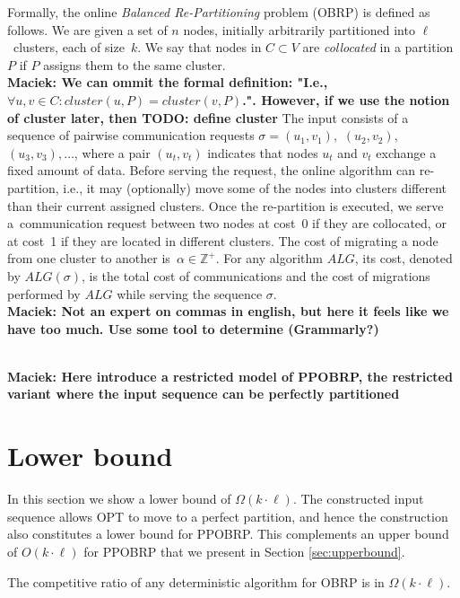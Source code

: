 \documentclass[manuscript,screen=true]{acmart}
\newcommand{\OBRP}{OBRP}
\newcommand{\PPOBRP}{PPOBRP}
\newcommand\maciek[1]{\color{brown}\textbf{\\ Maciek: #1}\color{black}}
\begin{document}
Formally, the online \emph{Balanced Re-Partitioning} problem (\OBRP{}) is defined as
follows. We are given a set of $n$ nodes,
initially arbitrarily partitioned into $\ell$~clusters,
each of size~$k$.
We say that nodes in $C \subset V$ are \emph{collocated} in a partition $P$
if $P$ assigns them to the same cluster.
\maciek{We can ommit the formal definition: "I.e.,
$\forall u,v \in C: \mathit{cluster} (u,P) = \mathit{cluster} (v,P)$.". However, if we use the notion of cluster later, then TODO: define cluster}
The input consists of a sequence of pairwise communication requests
$\sigma = (u_1,v_1),$ $(u_2,v_2),$ $(u_3,v_3), \ldots$,
where a pair $(u_t,v_t)$ indicates that nodes $u_t$ and $v_t$ exchange a fixed amount of data.
Before serving the request,
the online algorithm
can re-partition,
i.e.,
it may (optionally) move some of the nodes into clusters different than their current assigned clusters.
Once the re-partition is executed,
we serve
a~communication request between two  nodes at cost~0 if they are collocated,
or at cost~1 if they are located in different clusters.
The cost of migrating a node from one cluster to another
is~$\alpha \in \mathbb{Z}^+$.
For any algorithm $ALG$,
its cost,
denoted by $ALG(\sigma)$,
is the total cost of communications and
the cost of migrations performed by $ALG$ while serving the sequence $\sigma$.
\maciek{Not an expert on commas in english, but here it feels like we have too much. Use some tool to determine (Grammarly?)}

\maciek{Here introduce a restricted model of \PPOBRP{}, the restricted variant where the input sequence can be perfectly partitioned}

\section{Lower bound} %

In this section we show a lower bound of $\Omega(k \cdot \ell)$.
The constructed input sequence allows OPT to move to a perfect partition, and hence
the construction also constitutes a lower bound for \PPOBRP{}.
This complements an upper bound of $O(k \cdot \ell)$
for \PPOBRP{} that we present in Section \ref{sec:upperbound}.

\begin{theorem}
  The competitive ratio of any deterministic algorithm for \OBRP{} is in $\Omega(k\cdot \ell)$.
\end{theorem}
\end{document}
